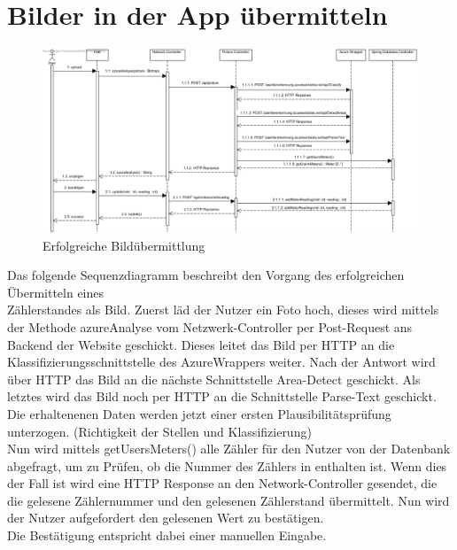 \section{Bilder in der App übermitteln}
\begin{figure}[H]
	\centering
	\caption{Erfolgreiche Bildübermittlung}
	\includegraphics[width=16cm]{img/diagrams/SubmitFotoSequence}
\end{figure}
Das folgende Sequenzdiagramm beschreibt den Vorgang des erfolgreichen Übermitteln eines \\Zählerstandes als Bild.
Zuerst läd der Nutzer ein Foto hoch, dieses wird mittels der Methode azureAnalyse vom Netzwerk-Controller per Post-Request ans Backend der Website geschickt. Dieses leitet das Bild per HTTP an die Klassifizierungsschnittstelle des AzureWrappers weiter. Nach der Antwort wird über HTTP das Bild an die nächste Schnittstelle Area-Detect geschickt. Als letztes wird das Bild noch per HTTP an die Schnittstelle Parse-Text geschickt. Die erhaltenenen Daten werden jetzt einer ersten Plausibilitätsprüfung unterzogen. (Richtigkeit der Stellen und Klassifizierung) \\
Nun wird mittels getUsersMeters() alle Zähler für den Nutzer von der Datenbank abgefragt, um zu Prüfen, ob die Nummer des Zählers in enthalten ist.
Wenn dies der Fall ist wird eine HTTP Response an den Network-Controller gesendet, die die gelesene Zählernummer und den gelesenen Zählerstand übermittelt. Nun wird der Nutzer aufgefordert den gelesenen Wert zu bestätigen. \\
Die Bestätigung entspricht dabei einer manuellen Eingabe.

